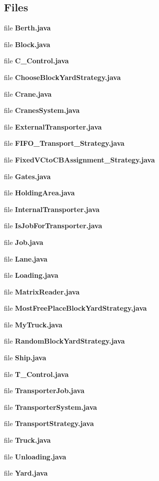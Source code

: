 \subsection*{Files}
\begin{DoxyCompactItemize}
\item 
file {\bfseries Berth.\-java}
\item 
file {\bfseries Block.\-java}
\item 
file {\bfseries C\-\_\-\-Control.\-java}
\item 
file {\bfseries Choose\-Block\-Yard\-Strategy.\-java}
\item 
file {\bfseries Crane.\-java}
\item 
file {\bfseries Cranes\-System.\-java}
\item 
file {\bfseries External\-Transporter.\-java}
\item 
file {\bfseries F\-I\-F\-O\-\_\-\-Transport\-\_\-\-Strategy.\-java}
\item 
file {\bfseries Fixed\-V\-Cto\-C\-B\-Assignment\-\_\-\-Strategy.\-java}
\item 
file {\bfseries Gates.\-java}
\item 
file {\bfseries Holding\-Area.\-java}
\item 
file {\bfseries Internal\-Transporter.\-java}
\item 
file {\bfseries Is\-Job\-For\-Transporter.\-java}
\item 
file {\bfseries Job.\-java}
\item 
file {\bfseries Lane.\-java}
\item 
file {\bfseries Loading.\-java}
\item 
file {\bfseries Matrix\-Reader.\-java}
\item 
file {\bfseries Most\-Free\-Place\-Block\-Yard\-Strategy.\-java}
\item 
file {\bfseries My\-Truck.\-java}
\item 
file {\bfseries Random\-Block\-Yard\-Strategy.\-java}
\item 
file {\bfseries Ship.\-java}
\item 
file {\bfseries T\-\_\-\-Control.\-java}
\item 
file {\bfseries Transporter\-Job.\-java}
\item 
file {\bfseries Transporter\-System.\-java}
\item 
file {\bfseries Transport\-Strategy.\-java}
\item 
file {\bfseries Truck.\-java}
\item 
file {\bfseries Unloading.\-java}
\item 
file {\bfseries Yard.\-java}
\end{DoxyCompactItemize}
